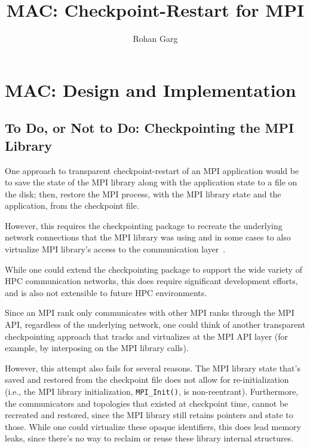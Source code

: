 \documentclass[11pt,letter]{article}
\newcommand{\sol}{MAC}
\begin{document}
\title{\sol{}: Checkpoint-Restart for MPI}

\author{Rohan Garg}

\maketitle

\section{\sol{}: Design and Implementation}
\label{sec:design}

\subsection{To Do, or Not to Do: Checkpointing the MPI Library}

One approach to transparent checkpoint-restart of an MPI application
would be to save the state of the MPI library along with the application
state to a file on the disk; then, restore the MPI process, with the MPI
library state and the application, from the checkpoint file.

However, this requires the checkpointing package to recreate the underlying
network connections that the MPI library was using and in some cases to also
virtualize MPI library's access to the communication layer~\cite{caophdthesis}.

While one could extend the checkpointing package to support the wide variety
of HPC communication networks, this does require significant development
efforts, and is also not extensible to future HPC environments.

Since an MPI rank only communicates with other MPI ranks through the MPI API,
regardless of the underlying network, one could think of another transparent
checkpointing approach that tracks and virtualizes at the MPI API layer (for
example, by interposing on the MPI library calls).

However, this attempt also fails for several reasons. The MPI library state
that's saved and restored from the checkpoint file does not allow for
re-initialization (i.e., the MPI library initialization, \texttt{MPI\_Init()},
is non-reentrant). Furthermore, the communicators and topologies that existed
at checkpoint time, cannot be recreated and restored, since the MPI library
still retains pointers and state to those. While one could virtualize these
opaque identifiers, this does lead memory leaks, since there's no way to
reclaim or reuse these library internal structures.
\end{document}
